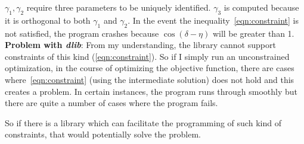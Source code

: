 \documentclass[a4paper,10pt]{report}
\numberwithin{equation}{chapter}
\begin{document}
$\gamma_1,\gamma_2$ require three parameters to be uniquely identified. $\gamma_3$
is computed because it is orthogonal to both $\gamma_1$ and $\gamma_2$.
In the event the inequality~\ref{eqn:constraint} is not satisfied, the program crashes
because $\cos (\delta-\eta)$ will be greater than 1. \\

\noindent \textbf{Problem with \emph{dlib}}: From my understanding, the library cannot support
constraints of this kind (\ref{eqn:constraint}). So if I simply run an unconstrained optimization,
in the course of optimizing the objective function,
there are cases where~\ref{eqn:constraint} (using the intermediate solution) does not hold and this creates a problem.
In certain instances, the program runs through smoothly but there are quite a number
of cases where the program fails.

So if there is a library which can facilitate the programming of such kind of constraints,
that would potentially solve the problem.
\end{document}
